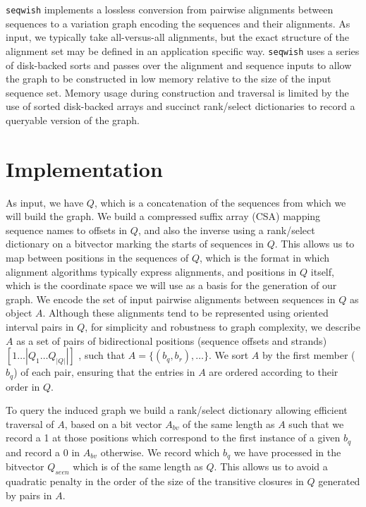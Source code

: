 \documentclass{bioinfo}
\begin{document}
    \texttt{seqwish} implements a lossless conversion from pairwise alignments between sequences to a variation graph encoding the sequences and their alignments.
    As input, we typically take all-versus-all alignments, but the exact structure of the alignment set may be defined in an application specific way.
    \texttt{seqwish} uses a series of disk-backed sorts and passes over the alignment and sequence inputs to allow the graph to be constructed in low memory relative to the size of the input sequence set.
    Memory usage during construction and traversal is limited by the use of sorted disk-backed arrays and succinct rank/select dictionaries to record a queryable version of the graph.


    \section{Implementation}
    \label{sec:implementation}
    As input, we have $Q$, which is a concatenation of the sequences from which we will build the graph.
    We build a compressed suffix array (CSA) mapping sequence names to offsets in $Q$, and also the inverse using a rank/select dictionary on a bitvector marking the starts of sequences in $Q$.
    This allows us to map between positions in the sequences of $Q$, which is the format in which alignment algorithms typically express alignments, and positions in $Q$ itself, which is the coordinate space we will use as a basis for the generation of our graph.
    We encode the set of input pairwise alignments between sequences in $Q$ as object $A$.
    Although these alignments tend to be represented using oriented interval pairs in $Q$, for simplicity and robustness to graph complexity, we describe $A$ as a set of pairs of bidirectional positions (sequence offsets and strands) $[1 \ldots |Q_1 \ldots Q_{|Q|}|]$ , such that $A = \{ (b_{q}, b_{r}), \ldots \}$.
    We sort $A$ by the first member ($b_{q}$) of each pair, ensuring that the entries in $A$ are ordered according to their order in $Q$.

    To query the induced graph we build a rank/select dictionary allowing efficient traversal of $A$, based on a bit vector $A_{bv}$ of the same length as $A$ such that we record a 1 at those positions which correspond to the first instance of a given $b_{q}$ and record a 0 in $A_{bv}$ otherwise.
    We record which $b_{q}$ we have processed in the bitvector $Q_{seen}$ which is of the same length as $Q$.
    This allows us to avoid a quadratic penalty in the order of the size of the transitive closures in $Q$ generated by pairs in $A$.
\end{document}
